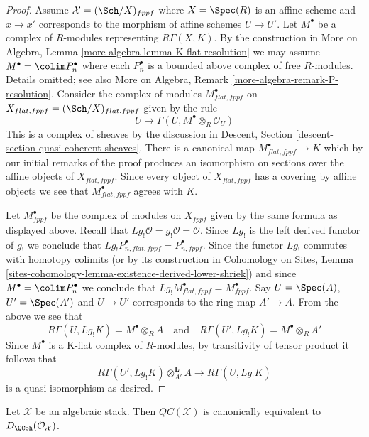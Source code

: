 \begin{proof}
\medskip\noindent
Assume $\mathcal{X} = (\Sch/X)_{fppf}$ where $X = \Spec(R)$
is an affine scheme and $x \to x'$ corresponds to the morphism
of affine schemes $U \to U'$. Let $M^\bullet$ be a complex
of $R$-modules representing $R\Gamma(X, K)$. By the construction in
More on Algebra, Lemma \ref{more-algebra-lemma-K-flat-resolution}
we may assume $M^\bullet = \colim P_n^\bullet$ where each $P_n^\bullet$
is a bounded above complex of free $R$-modules. Details omitted; see also
More on Algebra, Remark \ref{more-algebra-remark-P-resolution}.
Consider the complex of modules $M^\bullet_{flat, fppf}$ on
$X_{flat, fppf} = (\Sch/X)_{flat, fppf}$ given by the rule
$$
U \longmapsto \Gamma(U, M^\bullet \otimes_R \mathcal{O}_U)
$$
This is a complex of sheaves by the discussion in
Descent, Section \ref{descent-section-quasi-coherent-sheaves}.
There is a canonical map $M^\bullet_{flat, fppf} \to K$ which
by our initial remarks of the proof produces an isomorphism
on sections over the affine objects of $X_{flat, fppf}$.
Since every object of $X_{flat, fppf}$ has a covering by
affine objects we see that $M^\bullet_{flat, fppf}$ agrees with $K$.

\medskip\noindent
Let $M^\bullet_{fppf}$ be the complex of modules on $X_{fppf}$
given by the same formula as displayed above. 
Recall that $Lg_!\mathcal{O} = g_!\mathcal{O} = \mathcal{O}$.
Since $Lg_!$ is the left derived functor of $g_!$ we conclude
that $Lg_!P_{n, flat, fppf}^\bullet = P_{n, fppf}^\bullet$.
Since the functor $Lg_!$ commutes with homotopy colimits
(or by its construction in Cohomology on Sites,
Lemma \ref{sites-cohomology-lemma-existence-derived-lower-shriek})
and since $M^\bullet = \colim P_n^\bullet$
we conclude that $Lg_!M^\bullet_{flat, fppf} = M^\bullet_{fppf}$.
Say $U = \Spec(A)$, $U' = \Spec(A')$ and $U \to U'$ corresponds
to the ring map $A' \to A$. From the above we see that
$$
R\Gamma(U, Lg_!K) = M^\bullet \otimes_R A
\quad\text{and}\quad
R\Gamma(U', Lg_!K) = M^\bullet \otimes_R A'
$$
Since $M^\bullet$ is a K-flat complex of $R$-modules,
by transitivity of tensor product it follows that
$$
R\Gamma(U', Lg_!K) \otimes_{A'}^\mathbf{L} A
\longrightarrow
R\Gamma(U, Lg_!K)
$$
is a quasi-isomorphism as desired.
\end{proof}

\begin{proposition}
\label{proposition-QC-compare}
Let $\mathcal{X}$ be an algebraic stack. Then $\mathit{QC}(\mathcal{X})$
is canonically equivalent to $D_\QCoh(\mathcal{O}_\mathcal{X})$.
\end{proposition}


